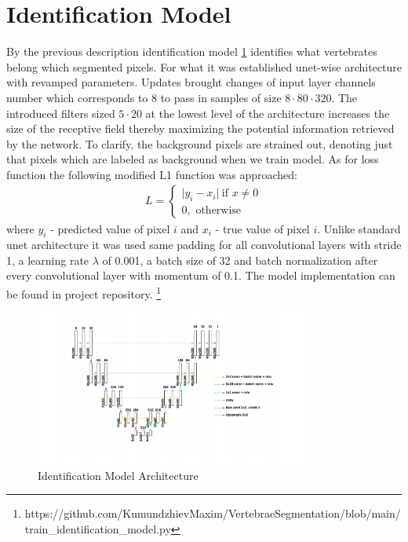 \section{Identification Model}
By the previous description identification model \ref{fig:identification_model} identifies what vertebrates belong which segmented pixels. For what it was established unet-wise architecture with revamped parameters. Updates brought changes of input layer channels number which corresponds to 8 to pass in samples of size $8 \cdot 80 \cdot 320$. The introduced filters sized $5 \cdot 20$ at the lowest level of the architecture  increases the size of the receptive field thereby maximizing the potential information retrieved by the network. To clarify, the background pixels are strained out, denoting just that pixels which are labeled as background when we train model. As for loss function the following modified L1 function was approached:
\begin{align*}
 L = \begin{cases} \lvert y_i - x_i \rvert\ \mbox{if } x\mbox{$\neq 0$} \\ 0, \mbox{ otherwise} \end{cases}
\end{align*}
where $y_i$ - predicted value of pixel $i$ and $x_i$ - true value of pixel $i$.
Unlike standard unet architecture it was used same padding for all convolutional layers with stride 1, a learning rate
$\lambda$ of 0.001, a batch size of 32 and batch normalization after every convolutional layer with momentum of 0.1. The model implementation can be found in project repository. \footnote{https://github.com/KumundzhievMaxim/VertebraeSegmentation/blob/main/train_identification_model.py}

\begin{figure}[h]
    \centering \includegraphics[width=9cm]{images/identification_model.png}
    \caption {Identification Model Architecture}
    \label{fig:identification_model}
\end{figure}

